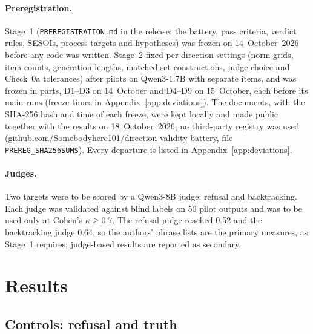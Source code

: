 \documentclass[11pt]{article}
\newif\ifanon
\begin{document}
\paragraph{Preregistration.} Stage~1 (\texttt{PREREGISTRATION.md} in the release: the battery, pass criteria, verdict rules, SESOIs, process targets and hypotheses) was frozen on 14~October~2026 before any code was written. Stage~2 fixed per-direction settings (norm grids, item counts, generation lengths, matched-set constructions, judge choice and Check~0a tolerances) after pilots on Qwen3-1.7B with separate items, and was frozen in parts, D1--D3 on 14~October and D4--D9 on 15~October, each before its main runs (freeze times in Appendix~\ref{app:deviations}). The documents, with the SHA-256 hash and time of each freeze, were kept locally and made public together with the results on 18~October~2026; no third-party registry was used\ifanon.\else{} (\href{https://github.com/Somebodyhere101/direction-validity-battery}{github.com/Somebodyhere101/direction-validity-battery}, file \texttt{PREREG\_SHA256SUMS}).\fi{} Every departure is listed in Appendix~\ref{app:deviations}.

\paragraph{Judges.} Two targets were to be scored by a Qwen3-8B judge: refusal and backtracking. Each judge was validated against blind labels on 50 pilot outputs and was to be used only at Cohen's $\kappa \ge 0.7$. The refusal judge reached 0.52 and the backtracking judge 0.64, so the authors' phrase lists are the primary measures, as Stage~1 requires; judge-based results are reported as secondary.

\section{Results}\label{sec:results}

\subsection{Controls: refusal and truth}
\end{document}
